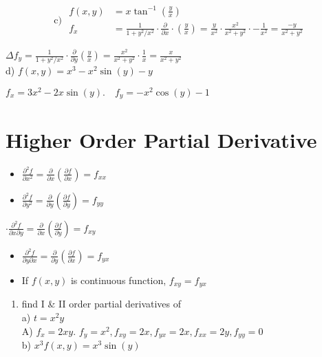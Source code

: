 \documentclass[12pt, a4paper]{article}
\begin{document}
$$
\text { c) } \begin{aligned}
f(x, y) & =x \tan ^{-1}\left(\frac{y}{x}\right) \\
f_{x} & =\frac{1}{1+y^{2} / x^{2}} \cdot \frac{\partial}{\partial x} \cdot\left(\frac{y}{x}\right)=\frac{y}{x^{2}} \cdot \frac{x^{2}}{x^{2}+y^{2}} \cdot-\frac{1}{x^{2}}=\frac{-y}{x^{2}+y^{2}}
\end{aligned}
$$

$\Delta f_{y}=\frac{1}{1+y^{2} / x^{2}} \cdot \frac{\partial}{\partial y}\left(\frac{y}{x}\right)=\frac{x^{2}}{x^{2}+y^{2}} \cdot \frac{1}{x}=\frac{x}{x^{2}+y^{2}}$\\
d) $f(x, y)=x^{3}-x^{2} \sin (y)-y$

$f_{x}=3 x^{2}-2 x \sin (y) . \quad f_{y}=-x^{2} \cos (y)-1$

\section*{Higher Order Partial Derivative}
\begin{itemize}
  \item $\frac{\partial^{2} f}{\partial x^{2}}=\frac{\partial}{\partial x}\left(\frac{\partial f}{\partial x}\right)=f_{x x}$
  \item $\frac{\partial^{2} f}{\partial y^{2}}=\frac{\partial}{\partial y}\left(\frac{\partial f}{\partial y}\right)=f_{y y}$
\end{itemize}

$\cdot \frac{\partial^{2} f}{\partial x \partial y}=\frac{\partial}{\partial x}\left(\frac{\partial f}{\partial y}\right)=f_{x y}$

\begin{itemize}
  \item $\frac{\partial^{2} f}{\partial y \partial x}=\frac{\partial}{\partial y}\left(\frac{\partial f}{\partial x}\right)=f_{y x}$
\end{itemize}

\begin{itemize}
  \item If $f(x, y)$ is continuous function, $f_{x y}=f_{y x}$
\end{itemize}

\begin{enumerate}
  \item find I \& II order partial derivatives of\\
a) $t=x^{2} y$\\
A) $f_{x}=2 x y$. $f_{y}=x^{2}, f_{x y}=2 x, f_{y x}=2 x, f_{x x}=2 y, f_{y y}=0$\\
b) $x^{3} f(x, y)=x^{3} \sin (y)$
\end{enumerate}
\end{document}
